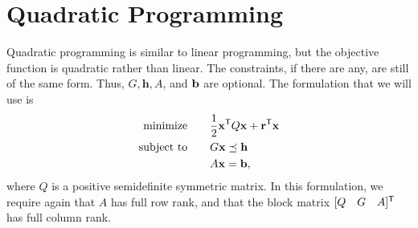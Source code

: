 \begin{comment}
>>> h = matrix([ 0., 0., 0., 0., 0., 0.,])
>>> o = matrix([4., 7., 6., 8., 8., 9])
>>> A = matrix([ [1., 0., 0., 1., 0.],
             [1., 0., 0., 0., 1.],
             [0., 1., 0., 1., 0.],
             [0., 1., 0., 0., 1.],
             [0., 0., 1., 1., 0.],
             [0., 0., 1., 0., 1.] ])
>>> b = matrix([7., 2., 4., 5., 8])
>>> sol = glpk.ilp(o,G,h,A,b)
>>> print sol[1]
\end{lstlisting}

\textbf{Problem 2}
Choose one of these methods and compare the optimal values for the integer linear program to the result you received above.

\textbf{Problem 3}
Create the dual problem for the linear program and solve.
Compare your answer to the dual value cvxopt returned.
\end{comment}

\section*{Quadratic Programming}

Quadratic programming is similar to linear programming, but the objective function is quadratic rather than linear.
The constraints, if there are any, are still of the same form.
Thus, $G, \mathbf{h}, A$, and $\mathbf{b}$ are optional.
The formulation that we will use is
\begin{align*}
\text{minimize}\qquad &\frac{1}{2}\mathbf{x}^{\mathsf T} Q\mathbf{x} + \mathbf{r}^{\mathsf T} \mathbf{x} \\
\text{subject to}\qquad &G\mathbf{x} \preceq \mathbf{h}\\
 &A\mathbf{x} = \mathbf{b},
\end{align*}
where $Q$ is a positive semidefinite symmetric matrix.
In this formulation, we require again that $A$ has full row rank, and that the block matrix
$[Q \quad G \quad A]^{\mathsf T} $ has full column rank.

